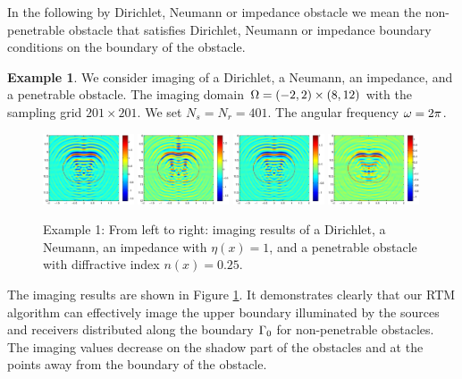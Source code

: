 \documentclass[12pt]{iopart}
\begin{document}
{In the following by Dirichlet, Neumann or impedance obstacle we mean the non-penetrable obstacle that
satisfies Dirichlet, Neumann or impedance boundary conditions on the boundary of the obstacle.

\bigskip
\textbf{Example 1}.
We consider imaging of a Dirichlet, a Neumann, an impedance, and a penetrable obstacle. The imaging domain $\Omega=(-2,2) \times (8, 12)$ with the sampling grid $201 \times 201$. We set $N_s = N_r = 401$. The angular frequency $\omega=2\pi$.
 \begin{figure}
 	\centering
 	\includegraphics[width=0.24\textwidth]{./graphic/peanut_3pi.eps}
 	\includegraphics[width=0.24\textwidth]{./graphic/peanut_3pi_neumann.eps}
 	\includegraphics[width=0.24\textwidth]{./graphic/peanut_3pi_impedance_1.eps}
 	\includegraphics[width=0.24\textwidth]{./graphic/peanut_3pi_transmission.eps}
 	\caption{Example 1: From left to right: imaging results of a Dirichlet, a Neumann, an impedance with $\eta(x)=1$, and a penetrable obstacle with diffractive index $n(x)=0.25$.} \label{figure_1}
 \end{figure}
 
 The imaging results are shown in Figure \ref{figure_1}. It demonstrates clearly that our RTM
 algorithm can effectively image the upper boundary illuminated by the sources and
 receivers distributed along the boundary $\Gamma_0$ for non-penetrable obstacles. The imaging
 values decrease on the shadow part of the obstacles and at the points away from the
 boundary of the obstacle.

}
\end{document}
